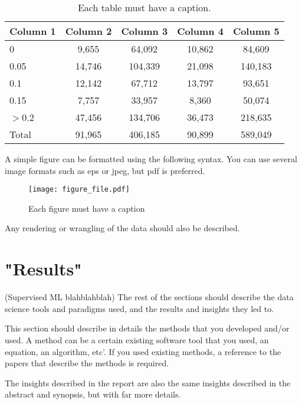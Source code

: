 \documentclass[article,pdftex,12pt,a4paper]{article}
\begin{document}
\begin{table}[h]
{
\scriptsize
\begin{tabular}{|l|c|c|c|c|}
\hline
Column 1 &  Column 2    &  Column 3  & Column 4 & Column 5 \\      
\hline
0   &    9,655   &   64,092  &  10,862     &    84,609    \\
0.05 &   14,746  &  104,339   & 21,098   &   140,183    \\
0.1 &    12,142  &  67,712  &  13,797   &    93,651    \\   
0.15  &  7,757    & 33,957  &  8,360     &     50,074    \\
$>$0.2  &  47,456    & 134,706    & 36,473    &   218,635    \\
\hline
Total      &  91,965 &  406,185  & 90,899   & 589,049  \\
\hline        
\end{tabular}
\caption{Each table must have a caption.}
\label{table_label}

}
\end{table}

A simple figure can be formatted using the following syntax. You can use several image formats such as eps or jpeg, but pdf is preferred.

\begin{figure*}
\centering
\texttt{[image: figure\_file.pdf]}
\caption{Each figure must have a caption}
\label{figure_label}
\end{figure*}

Any rendering or wrangling of the data should also be described.



\section{"Results"}
(Supervised ML blahblahblah) The rest of the sections should describe the data science tools and paradigms used, and the results and insights they led to. 

This section should describe in details the methods that you developed and/or used. A method can be a certain existing software tool that you used, an equation, an algorithm, etc’.  If you used existing methods, a reference to the papers that describe the methods is required.

The insights described in the report are also the same insights described in the abstract and synopsis, but with far more details.
\end{document}
